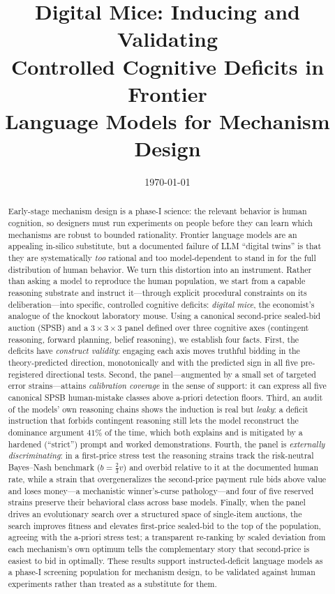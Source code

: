 \documentclass[12pt]{article}
\title{\textbf{Digital Mice: Inducing and Validating\\ Controlled Cognitive Deficits in Frontier\\ Language Models for Mechanism Design}}
\author{}
\date{\today}
\begin{document}
\maketitle

\begin{abstract}
\noindent Early-stage mechanism design is a phase-I science: the relevant
behavior is human cognition, so designers must run experiments on people before
they can learn which mechanisms are robust to bounded rationality. Frontier
language models are an appealing in-silico substitute, but a documented failure
of LLM ``digital twins'' is that they are systematically \emph{too} rational and
too model-dependent to stand in for the full distribution of human behavior. We
turn this distortion into an instrument. Rather than asking a model to reproduce
the human population, we start from a capable reasoning substrate and instruct
it---through explicit procedural constraints on its deliberation---into specific,
controlled cognitive deficits: \emph{digital mice}, the economist's analogue of
the knockout laboratory mouse. Using a canonical second-price sealed-bid auction
(SPSB) and a $3\times3\times3$ panel defined over three cognitive axes
(contingent reasoning, forward planning, belief reasoning), we establish four
facts. First, the deficits have \emph{construct validity}: engaging each axis
moves truthful bidding in the theory-predicted direction, monotonically and with
the predicted sign in all five pre-registered directional tests. Second, the
panel---augmented by a small set of targeted error strains---attains
\emph{calibration coverage} in the sense of support: it can express all five
canonical SPSB human-mistake classes above a-priori detection floors. Third, an
audit of the models' own reasoning chains shows the induction is real but
\emph{leaky}: a deficit instruction that forbids contingent reasoning still lets
the model reconstruct the dominance argument $41\%$ of the time, which both
explains and is mitigated by a hardened (``strict'') prompt and worked
demonstrations. Fourth, the panel is \emph{externally discriminating}: in a
first-price stress test the reasoning strains track the risk-neutral
Bayes--Nash benchmark ($b=\tfrac23 v$) and overbid relative to it at the
documented human rate, while a strain that overgeneralizes the second-price
payment rule bids above value and loses money---a mechanistic winner's-curse
pathology---and four of five reserved strains preserve their behavioral class
across base models. Finally, when the panel drives an evolutionary search over a
structured space of single-item auctions, the search improves fitness and
elevates first-price sealed-bid to the top of the population, agreeing with the
a-priori stress test; a transparent re-ranking by scaled deviation from each
mechanism's own optimum tells the complementary story that second-price is
easiest to bid in optimally. These results support instructed-deficit language
models as a phase-I screening population for mechanism design, to be validated
against human experiments rather than treated as a substitute for them.


\end{abstract}
\end{document}
